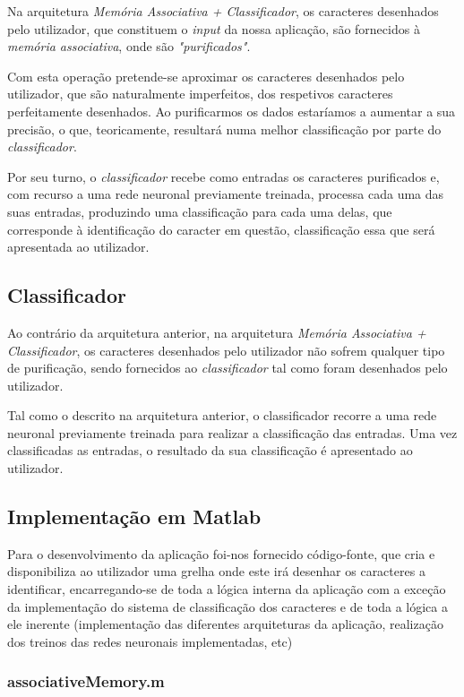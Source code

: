 \documentclass{article}
\begin{document}
Na arquitetura \emph{Memória Associativa + Classificador}, os caracteres desenhados pelo utilizador, que constituem o \emph{input} da nossa aplicação, são fornecidos à \emph{memória associativa}, onde são \emph{"purificados"}.

Com esta operação pretende-se aproximar os caracteres desenhados pelo utilizador, que são naturalmente imperfeitos, dos respetivos caracteres perfeitamente desenhados. Ao purificarmos os dados estaríamos a aumentar a sua precisão, o que, teoricamente, resultará numa melhor classificação por parte do \emph{classificador}.

Por seu turno, o \emph{classificador} recebe como entradas os caracteres purificados e, com recurso a uma rede neuronal previamente treinada, processa cada uma das suas entradas, produzindo uma classificação para cada uma delas, que corresponde à identificação do caracter em questão, classificação essa que será apresentada ao utilizador.

\subsection{Classificador}

Ao contrário da arquitetura anterior, na arquitetura \emph{Memória Associativa + Classificador}, os caracteres desenhados pelo utilizador não sofrem qualquer tipo de purificação, sendo fornecidos ao \emph{classificador} tal como foram desenhados pelo utilizador.

Tal como o descrito na arquitetura anterior, o classificador recorre a uma rede neuronal previamente treinada para realizar a classificação das entradas. Uma vez classificadas as entradas, o resultado da sua classificação é apresentado ao utilizador.


\subsection{Implementação em Matlab}

Para o desenvolvimento da aplicação foi-nos fornecido código-fonte, que cria e disponibiliza ao utilizador uma grelha onde este irá desenhar os caracteres a identificar, encarregando-se de toda a lógica interna da aplicação com a exceção da implementação do sistema de classificação dos caracteres e de toda a lógica a ele inerente (implementação das diferentes arquiteturas da aplicação, realização dos treinos das redes neuronais implementadas, etc)

\subsubsection{associativeMemory.m}
\end{document}
